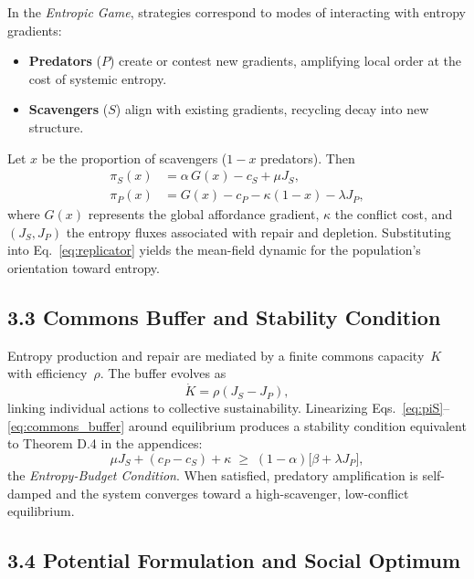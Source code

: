 \documentclass[11pt,a4paper,titlepage]{article}
\theoremstyle{definition}
\begin{document}
In the \emph{Entropic Game}, strategies correspond to modes of interacting with
entropy gradients:
\begin{itemize}[nosep]
  \item \textbf{Predators} ($P$) create or contest new gradients,
        amplifying local order at the cost of systemic entropy.
  \item \textbf{Scavengers} ($S$) align with existing gradients,
        recycling decay into new structure.
\end{itemize}
Let $x$ be the proportion of scavengers ($1\!-\!x$ predators).
Then
\begin{align}
\pi_S(x) &= \alpha\,G(x) - c_S + \mu J_S, \label{eq:piS}\\
\pi_P(x) &= G(x) - c_P - \kappa(1-x) - \lambda J_P, \label{eq:piP}
\end{align}
where $G(x)$ represents the global affordance gradient,
$\kappa$ the conflict cost,
and $(J_S,J_P)$ the entropy fluxes associated with repair and depletion.
Substituting into Eq.~\eqref{eq:replicator} yields the mean-field dynamic for
the population’s orientation toward entropy.

\subsection{3.3 Commons Buffer and Stability Condition}

Entropy production and repair are mediated by a finite commons capacity~$K$
with efficiency~$\rho$.  The buffer evolves as
\begin{equation}
\dot{K} = \rho(J_S - J_P),
\label{eq:commons_buffer}
\end{equation}
linking individual actions to collective sustainability.
Linearizing Eqs.~\eqref{eq:piS}–\eqref{eq:commons_buffer} around equilibrium
produces a stability condition equivalent to Theorem D.4 in the appendices:
\begin{equation}
\mu J_S + (c_P - c_S) + \kappa
  \;\ge\;
  (1-\alpha)\big[\beta + \lambda J_P\big],
\label{eq:stability}
\end{equation}
the \emph{Entropy-Budget Condition}.
When satisfied, predatory amplification is self-damped and the system converges
toward a high-scavenger, low-conflict equilibrium.

\subsection{3.4 Potential Formulation and Social Optimum}
\end{document}
